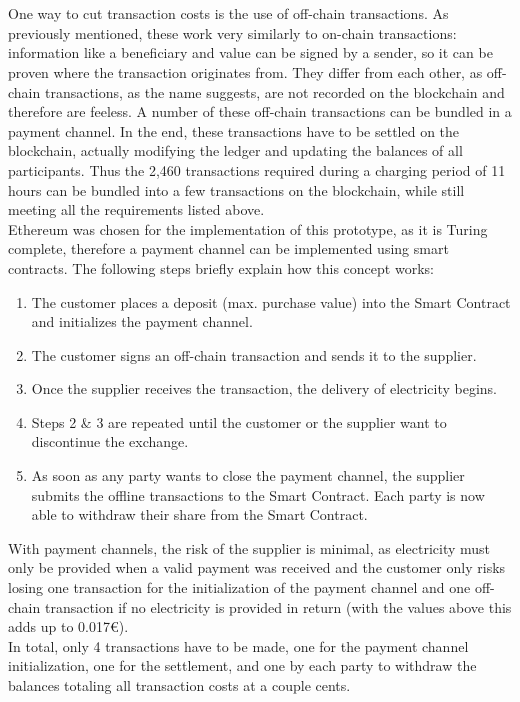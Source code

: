 \\\\
One way to cut transaction costs is the use of off-chain transactions. As previously mentioned, these work very similarly to on-chain transactions: information like a beneficiary and value can be signed by a sender, so it can be proven where the transaction originates from. They differ from each other, as off-chain transactions, as the name suggests, are not recorded on the blockchain and therefore are feeless. A number of these off-chain transactions can be bundled in a payment channel. In the end, these transactions have to be settled on the blockchain, actually modifying the ledger and updating the balances of all participants. Thus the 2,460 transactions required during a charging period of 11 hours can be bundled into a few transactions on the blockchain, while still meeting all the requirements listed above.
\\
Ethereum was chosen for the implementation of this prototype, as it is Turing complete, therefore a payment channel can be implemented using smart contracts. The following steps briefly explain how this concept works:

\begin{enumerate}
    \item The customer places a deposit (max. purchase value) into the Smart Contract and initializes the payment channel.
    \item The customer signs an off-chain transaction and sends it to the supplier.
    \item Once the supplier receives the transaction, the delivery of electricity begins.
    \item Steps 2 \& 3 are repeated until the customer or the supplier want to discontinue the exchange.
    \item As soon as any party wants to close the payment channel, the supplier submits the offline transactions to the Smart Contract. Each party is now able to withdraw their share from the Smart Contract.
\end{enumerate}
With payment channels, the risk of the supplier is minimal, as electricity must only be provided when a valid payment was received and the customer only risks losing one transaction for the initialization of the payment channel and one off-chain transaction if no electricity is provided in return (with the values above this adds up to 0.017\euro).
\\
In total, only 4 transactions have to be made, one for the payment channel initialization, one for the settlement, and one by each party to withdraw the balances totaling all transaction costs at a couple cents.